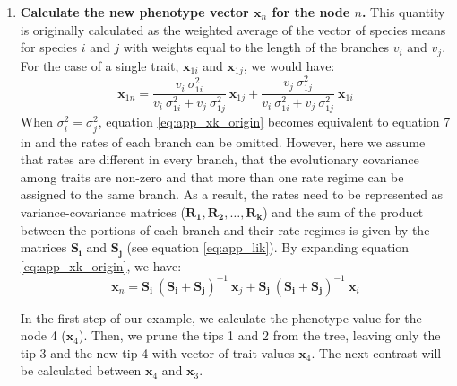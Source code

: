\begin{enumerate}
\item \textbf{Calculate the new phenotype vector $\mathbf{x}_{n}$ for the node $n$.} This quantity is originally calculated as the weighted average of the vector of species means for species $i$ and $j$ with weights equal to the length of the branches $v_{i}$ and $v_{j}$. For the case of a single trait, $\mathbf{x}_{1i}$ and $\mathbf{x}_{1j}$, we would have:
\begin{equation} \label{eq:app_xk_origin}
\mathbf{x}_{1n} = \frac{v_{i} \: \sigma_{1i}^{2}}{v_{i} \: \sigma_{1i}^{2} + v_{j} \: \sigma_{1j}^{2} } \: \mathbf{x}_{1j} + \frac{v_{j} \: \sigma_{1j}^{2} }{v_{i} \: \sigma_{1i}^{2} + v_{j} \: \sigma_{1j}^{2}} \: \mathbf{x}_{1i}
\end{equation}
When $\sigma_{i}^{2} = \sigma_{j}^{2}$, equation \ref{eq:app_xk_origin} becomes equivalent to equation 7 in \citet{felsenstein_1973} and the rates of each branch can be omitted. However, here we assume that rates are different in every branch, that the evolutionary covariance among traits are non-zero and that more than one rate regime can be assigned to the same branch. As a result, the rates need to be represented as variance-covariance matrices ($ \mathbf{R_1}, \mathbf{R_2}, \ldots, \mathbf{R_k} $) and the sum of the product between the portions of each branch and their rate regimes is given by the matrices $ \mathbf{S_{i}} $ and $\mathbf{S_{j}}$ (see equation \ref{eq:app_lik}). By expanding equation \ref{eq:app_xk_origin}, we have:
\begin{equation} \label{eq:app_xk_mult}
\mathbf{x}_{n} = \mathbf{S_{i}} \: ( \mathbf{S_{i}} + \mathbf{S_{j}} )^{-1} \: \mathbf{x}_{j} + \mathbf{S_{j}} \: ( \mathbf{S_{i}} + \mathbf{S_{j}} )^{-1} \: \mathbf{x}_{i}
\end{equation}

\pagebreak

In the first step of our example, we calculate the phenotype value for the node 4 ($\mathbf{x}_{4}$). Then, we prune the tips 1 and 2 from the tree, leaving only the tip 3 and the new tip 4 with vector of trait values $\mathbf{x}_{4}$. The next contrast will be calculated between $\mathbf{x}_{4}$ and $\mathbf{x}_{3}$.


\end{enumerate}

